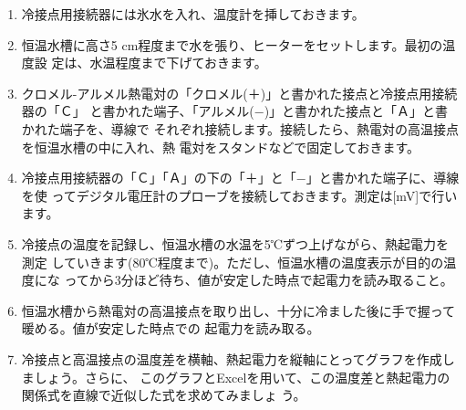 \begin{enumerate}

\item 冷接点用接続器には氷水を入れ、温度計を挿しておきます。

\item 恒温水槽に高さ5 cm程度まで水を張り、ヒーターをセットします。最初の温度設
定は、水温程度まで下げておきます。

\item クロメル-アルメル熱電対の「クロメル(＋)」と書かれた接点と冷接点用接続器の「Ｃ」 
と書かれた端子、「アルメル(−)」と書かれた接点と「Ａ」と書かれた端子を、導線で 
それぞれ接続します。接続したら、熱電対の高温接点を恒温水槽の中に入れ、熱 
電対をスタンドなどで固定しておきます。

\item 冷接点用接続器の「Ｃ」「Ａ」の下の「＋」と「−」と書かれた端子に、導線を使 
ってデジタル電圧計のプローブを接続しておきます。測定は[mV]で行います。

\item 冷接点の温度を記録し、恒温水槽の水温を5℃ずつ上げながら、熱起電力を測定 
していきます(80℃程度まで)。ただし、恒温水槽の温度表示が目的の温度にな 
ってから3分ほど待ち、値が安定した時点で起電力を読み取ること。

\item 恒温水槽から熱電対の高温接点を取り出し、十分に冷ました後に手で握って暖める。値が安定した時点での
起電力を読み取る。

\item 冷接点と高温接点の温度差を横軸、熱起電力を縦軸にとってグラフを作成しましょう。さらに、
このグラフとExcelを用いて、この温度差と熱起電力の関係式を直線で近似した式を求めてみましょ
う。

\end{enumerate}



